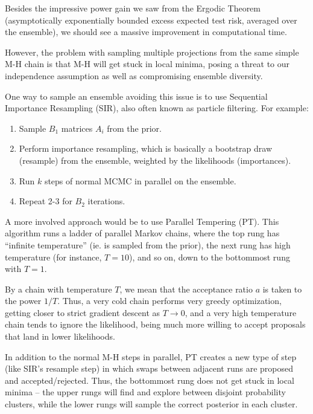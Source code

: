 \documentclass[ejs,preprint]{imsart}
\begin{document}
Besides the impressive power gain we saw from the Ergodic Theorem (asymptotically exponentially bounded excess expected test risk, averaged over the ensemble), we should see a massive improvement in computational time.

However, the problem with sampling multiple projections from the same simple M-H chain is that M-H will get stuck in local minima, posing a threat to our independence assumption as well as compromising ensemble diversity.

One way to sample an ensemble avoiding this issue is to use Sequential Importance Resampling (SIR), also often known as particle filtering. For example:
\begin{enumerate}
\item Sample $B_1$ matrices $A_i$ from the prior.
\item Perform importance resampling, which is basically a bootstrap draw (resample) from the ensemble, weighted by the likelihoods (importances).
\item Run $k$ steps of normal MCMC in parallel on the ensemble.
\item Repeat 2-3 for $B_2$ iterations.
\end{enumerate}

A more involved approach would be to use Parallel Tempering (PT). This algorithm runs a ladder of parallel Markov chains, where the top rung has ``infinite temperature'' (ie. is sampled from the prior), the next rung has high temperature (for instance, $T=10$), and so on, down to the bottommost rung with $T=1$.

By a chain with temperature $T$, we mean that the acceptance ratio $a$ is taken to the power $1/T$. Thus, a very cold chain performs very greedy optimization, getting closer to strict gradient descent as $T\to 0$, and a very high temperature chain tends to ignore the likelihood, being much more willing to accept proposals that land in lower likelihoods.

In addition to the normal M-H steps in parallel, PT creates a new type of step (like SIR's resample step) in which swaps between adjacent runs are proposed and accepted/rejected. Thus, the bottommost rung does not get stuck in local minima -- the upper rungs will find and explore between disjoint probability clusters, while the lower rungs will sample the correct posterior in each cluster.




















\end{document}
